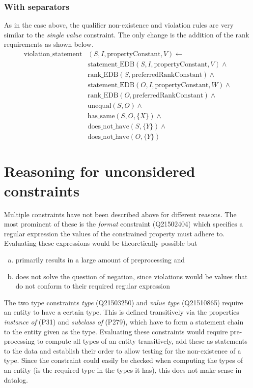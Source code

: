 \documentclass[hyperref,bachelorofscience,fleqn]{cgvpub}
\begin{document}
\subsubsection{With separators}
As in the case above, the qualifier non-existence and violation rules are very similar to the \emph{single value} constraint. The only change is the addition of the rank requirements as shown below.
\begin{equation*}
\begin{split}
\text{violation\_statement}&(S, I, \text{propertyConstant}, V) \leftarrow \\
&\text{statement\_EDB}(S, I, \text{propertyConstant}, V) \wedge{} \\
&\text{rank\_EDB}(S, \text{preferredRankConstant}) \wedge{} \\
&\text{statement\_EDB}(O, I, \text{propertyConstant}, W) \wedge{} \\
&\text{rank\_EDB}(O, \text{preferredRankConstant}) \wedge{} \\
&\text{unequal}(S, O) \wedge{} \\
&\text{has\_same}(S, O, \{X\}) \wedge{} \\
&\text{does\_not\_have}(S, \{Y\}) \wedge{} \\
&\text{does\_not\_have}(O, \{Y\})
\end{split}
\end{equation*}

\section{Reasoning for unconsidered constraints}
Multiple constraints have not been described above for different reasons. The most prominent of these is the \emph{format} constraint (Q21502404) which specifies a regular expression the values of the constrained property must adhere to. Evaluating these expressions would be theoretically possible but \\
\begin{enumerate}[a)]
\item primarily results in a large amount of preprocessing and
\item does not solve the question of negation, since violations would be values that do not conform to their required regular expression
\end{enumerate}

The two type constraints \emph{type} (Q21503250) and \emph{value type} (Q21510865) require an entity to have a certain type. This is defined transitively via the properties \emph{instance of} (P31) and \emph{subclass of} (P279), which have to form a statement chain to the entity given as the type. Evaluating these constraints would require pre-processing to compute all types of an entity transitively, add these as statements to the data and establish their order to allow testing for the non-existence of a type. Since the constraint could easily be checked when computing the types of an entity (is the required type in the types it has), this does not make sense in datalog.
\end{document}

